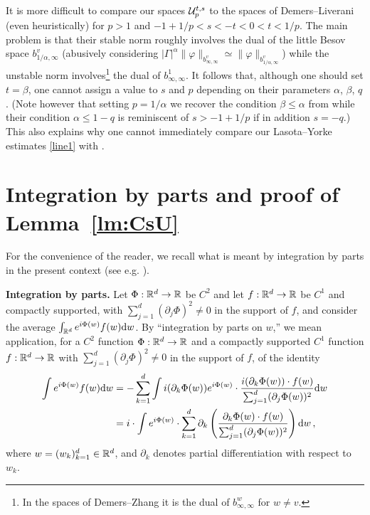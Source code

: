 \documentclass[10pt,twoside]{amsart}
\begin{document}
\medskip
\begin{remark}\label{DLZ}
It is more difficult to compare our spaces $\mathcal{U}^{t,s}_p$ to the spaces
of Demers--Liverani \cite{DL} (even heuristically) for $p>1$ and
$-1+1/p<s<-t<0<t<1/p$. The main problem is that their stable norm roughly involves
the dual of the little Besov space
$b^{v}_{1/\alpha,\infty}$ (abusively considering
$|\Gamma|^{\alpha} \|\varphi\|_{b^{v}_{\infty,\infty}}\simeq \|\varphi\|_{b^{v}_{1/\alpha,\infty}}$) 
while the unstable norm involves\footnote{In the spaces of Demers--Zhang \cite{DZ}
it is the dual of
$b^{w}_{\infty,\infty}$ for $w\ne v$.} the dual of
$b^{1}_{\infty,\infty}$. It follows that, although 
one should set $t=\beta$,   one cannot assign a value to $s$ and $p$ depending on
their parameters $\alpha$, $\beta$, $q$.
(Note however that setting $p=1/\alpha$ we recover the condition $\beta \le \alpha$
from \cite{DL} while their condition $\alpha \le 1-q$ is reminiscent
of $s> -1+1/p$ if in addition $s=-q$.)
This  also explains why one cannot immediately compare our Lasota--Yorke
estimates \eqref{line1} with \cite[Prop. 2.7]{DL}.
\end{remark}

\section{Integration by parts and proof of Lemma~\ref{lm:CsU}}
\label{partsparts}



For the convenience of the reader, we recall what is meant by integration by parts in
the present  context (see e.g. \cite{BG1}).

{\bf Integration by parts.}
Let $\Phi:\mathbb{R}^d \to \mathbb{R}$ be $C^2$ and
let $f:\mathbb{R}^d\to \mathbb{R}$ be $C^1$ and  compactly supported,  with
$\sum_{j=1}^{d}(\partial_j \Phi)^2\ne 0$
in the support of $f$, and consider the average  $\int_{\mathbb{R}^d} e^{i \Phi(w)}f(w) \mathrm {d} w$.
By ``integration by parts on $w$,'' we  mean application, 
for a  $C^2$ function $\Phi:\mathbb{R}^d \to \mathbb{R}$ and a compactly supported $C^1$ function $f:\mathbb{R}^d\to \mathbb{R}$ with
$\sum_{j=1}^{d}(\partial_j \Phi)^2\ne 0$
in the support of $f$,
of the identity
\begin{align*}
 \int e^{i \Phi(w)}f(w) \mathrm {d} w
&=
-\sum_{k=1}^d 
\int i(\partial_k \Phi(w))e^{i \Phi(w)}\cdot 
\frac{i(\partial_k \Phi(w))\cdot f(w)}
{\sum_{j=1}^{d}(\partial_j \Phi(w))^2} \mathrm {d} w
\\
\nonumber &=
i\cdot \int e^{i \Phi(w)}\cdot \sum_{k=1}^d \partial_k\left(\frac
{\partial_k \Phi(w)\cdot  f(w)}
{\sum_{j=1}^{d}(\partial_j \Phi(w))^2}\right) \mathrm {d} w \, ,
\end{align*}
where $w=(w_k)_{k=1}^{d}\in \mathbb{R}^d$, and $\partial_k$ denotes partial differentiation 
with respect to $w_k$.  
\end{document}
